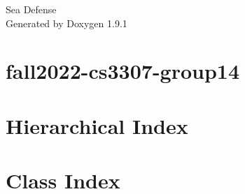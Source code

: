 \let\mypdfximage\pdfximage\def\pdfximage{\immediate\mypdfximage}\documentclass[twoside]{book}
\newcommand{\+}{\discretionary{\mbox{\scriptsize$\hookleftarrow$}}{}{}}
\newcommand{\clearemptydoublepage}{%
  \newpage{\pagestyle{empty}\cleardoublepage}%
}
\begin{document}
\raggedbottom

\hypersetup{pageanchor=false,
             bookmarksnumbered=true,
             pdfencoding=unicode
            }
\begin{titlepage}
\vspace*{7cm}
\begin{center}%
{\Large Sea Defense }\\
\vspace*{1cm}
{\large Generated by Doxygen 1.9.1}\\
\end{center}
\end{titlepage}
\clearemptydoublepage
{}
\tableofcontents
\clearemptydoublepage
{}
\hypersetup{pageanchor=true}

\chapter{fall2022-\/cs3307-\/group14}
\label{md_README}

\chapter{Hierarchical Index}

\chapter{Class Index}

\end{document}

